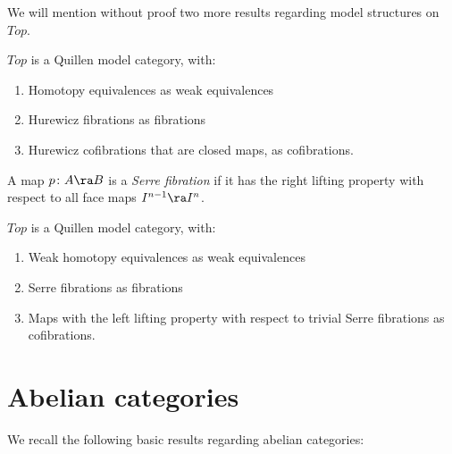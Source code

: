 We will mention without proof two more results regarding model structures on $Top$.

\begin{thm}
\label{thm:stromtop}
$Top$ is a Quillen model category, with:
\begin{enumerate}
\item
Homotopy equivalences as weak equivalences
\item
Hurewicz fibrations as fibrations
\item
Hurewicz cofibrations that are closed maps, as cofibrations.
\end{enumerate}
\end{thm}

\begin{defn}
\label{defn:serrefib}
\mbox{}
A map $p \colon A \ra B$ is a {\it Serre fibration}  if it has the right lifting property with respect to all face maps  $I^{n-1} \ra I^n$.
\end{defn}

\begin{thm}
\label{thm:quillentop}
$Top$ is a Quillen model category, with:
\begin{enumerate}
\item
Weak homotopy equivalences as weak equivalences
\item
Serre fibrations as fibrations
\item
Maps with the left lifting property with respect to trivial Serre fibrations as cofibrations.
\end{enumerate}
\end{thm}

\section{Abelian categories}
\label{sec:exampleabcat}

We recall the following basic results regarding abelian categories:


